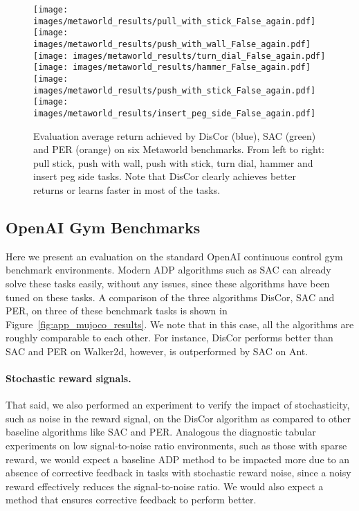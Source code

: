 \documentclass[jmlr]{article}
\begin{document}
\begin{figure*}
    \centering
    \texttt{[image: images/metaworld\_results/pull\_with\_stick\_False\_again.pdf]}
    \texttt{[image: images/metaworld\_results/push\_with\_wall\_False\_again.pdf]}
    \texttt{[image: images/metaworld\_results/turn\_dial\_False\_again.pdf]} \\
    \texttt{[image: images/metaworld\_results/hammer\_False\_again.pdf]}
    \texttt{[image: images/metaworld\_results/push\_with\_stick\_False\_again.pdf]}
    \texttt{[image: images/metaworld\_results/insert\_peg\_side\_False\_again.pdf]}
    \caption{\footnotesize{Evaluation average return achieved by DisCor (blue), SAC (green) and PER (orange) on six Metaworld benchmarks. From left to right: pull stick, push with wall, push with stick, turn dial, hammer and insert peg side tasks. Note that DisCor clearly achieves better returns or learns faster in most of the tasks.}}
    \label{fig:app_returns_metaworld}
\end{figure*}

\subsection{OpenAI Gym Benchmarks}
\label{sec:app_mujoco_benchmarks}
Here we present an evaluation on the standard OpenAI continuous control gym benchmark environments. Modern ADP algorithms such as SAC can already solve these tasks easily, without any issues, since these algorithms have been tuned on these tasks. A comparison of the three algorithms DisCor, SAC and PER, on three of these benchmark tasks is shown in Figure~\ref{fig:app_mujoco_results}. We note that in this case, all the algorithms are roughly comparable to each other. For instance, DisCor performs better than SAC and PER on Walker2d, however, is outperformed by SAC on Ant. 

\paragraph{Stochastic reward signals.} That said, we also performed an experiment to verify the impact of stochasticity, such as noise in the reward signal, on the DisCor algorithm as compared to other baseline algorithms like SAC and PER. Analogous the diagnostic tabular experiments on low signal-to-noise ratio environments, such as those with sparse reward, we would expect a baseline ADP method to be impacted more due to an absence of corrective feedback in tasks with stochastic reward noise, since a noisy reward effectively reduces the signal-to-noise ratio. We would also expect a method that ensures corrective feedback to perform better. 
\end{document}
